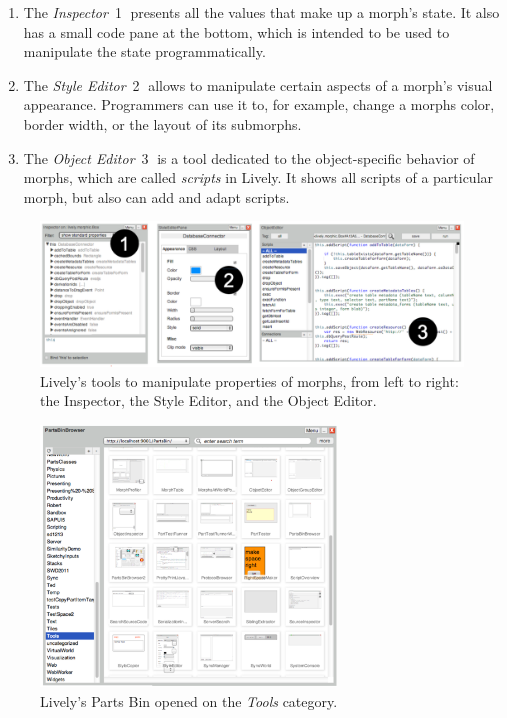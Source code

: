 \begin{enumerate}
    \item The \emph{Inspector}~\textcircled{1} presents all the values that make up a morph's state. It also has a small code pane at the bottom, which is intended to be used to manipulate the state programmatically.
    \item The \emph{Style Editor}~\textcircled{2} allows to manipulate certain aspects of a morph's visual appearance. Programmers can use it to, for example, change a morphs color, border width, or the layout of its submorphs.
    \item The \emph{Object Editor}~\textcircled{3} is a tool dedicated to the object-specific behavior of morphs, which are called \emph{scripts} in Lively. It shows all scripts of a particular morph, but also can add and adapt scripts.
\end{enumerate}

\begin{figure}[h]
    \centering
    \includegraphics[width=\textwidth]{figures/livelyTools.pdf}
    \caption{Lively's tools to manipulate properties of morphs, from left to right: the Inspector, the Style Editor, and the Object Editor.}
    \label{fig:LivelyTools}
\end{figure}

\begin{figure}[h]
    \centering
    \includegraphics[width=0.7\textwidth]{figures/partsBin.pdf}
    \caption{Lively's Parts Bin opened on the \emph{Tools} category.}
    \label{fig:PartsBin}
\end{figure}


